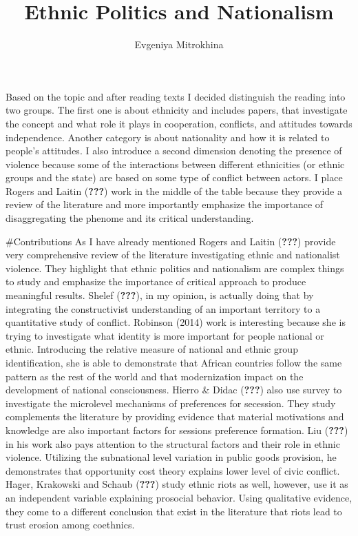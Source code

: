 \documentclass[
  english,
  man]{apa6}
\title{Ethnic Politics and Nationalism}
\author{Evgeniya Mitrokhina\textsuperscript{}}
\date{}
\affiliation{\phantom{0}}
\begin{document}
\maketitle

Based on the topic and after reading texts I decided distinguish the reading into two groups. The first one is about ethnicity and includes papers, that investigate the concept and what role it plays in cooperation, conflicts, and attitudes towards independence. Another category is about nationality and how it is related to people's attitudes. I also introduce a second dimension denoting the presence of violence because some of the interactions between different ethnicities (or ethnic groups and the state) are based on some type of conflict between actors. I place Rogers and Laitin ({\textbf{???}}) work in the middle of the table because they provide a review of the literature and more importantly emphasize the importance of disaggregating the phenome and its critical understanding.

\#Contributions
As I have already mentioned Rogers and Laitin ({\textbf{???}}) provide very comprehensive review of the literature investigating ethnic and nationalist violence. They highlight that ethnic politics and nationalism are complex things to study and emphasize the importance of critical approach to produce meaningful results. Shelef ({\textbf{???}}), in my opinion, is actually doing that by integrating the constructivist understanding of an important territory to a quantitative study of conflict. Robinson (2014) work is interesting because she is trying to investigate what identity is more important for people national or ethnic. Introducing the relative measure of national and ethnic group identification, she is able to demonstrate that African countries follow the same pattern as the rest of the world and that modernization impact on the development of national consciousness. Hierro \& Didac ({\textbf{???}}) also use survey to investigate the microlevel mechanisms of preferences for secession. They study complements the literature by providing evidence that material motivations and knowledge are also important factors for sessions preference formation. Liu ({\textbf{???}}) in his work also pays attention to the structural factors and their role in ethnic violence. Utilizing the subnational level variation in public goods provision, he demonstrates that opportunity cost theory explains lower level of civic conflict. Hager, Krakowski and Schaub ({\textbf{???}}) study ethnic riots as well, however, use it as an independent variable explaining prosocial behavior. Using qualitative evidence, they come to a different conclusion that exist in the literature that riots lead to trust erosion among coethnics.
\end{document}
